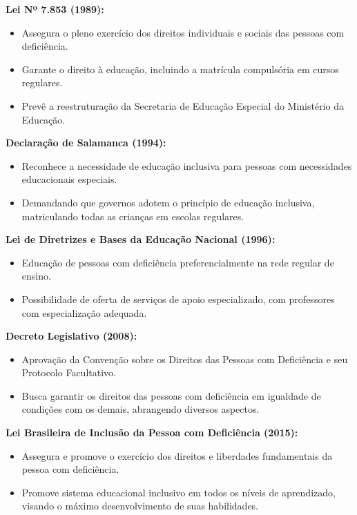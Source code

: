     \textbf{Lei Nº 7.853 (1989):}
    \begin{itemize}
        \item Assegura o pleno exercício dos direitos individuais e sociais das pessoas com deficiência.
        \item Garante o direito à educação, incluindo a matrícula compulsória em cursos regulares.
        \item Prevê a reestruturação da Secretaria de Educação Especial do Ministério da Educação.
    \end{itemize}

    \textbf{Declaração de Salamanca (1994):}
    \begin{itemize}
        \item Reconhece a necessidade de educação inclusiva para pessoas com necessidades educacionais especiais.
        \item Demandando que governos adotem o princípio de educação inclusiva, matriculando todas as crianças em escolas   regulares.
    \end{itemize}

    \textbf{Lei de Diretrizes e Bases da Educação Nacional (1996):}
    \begin{itemize}
        \item Educação de pessoas com deficiência preferencialmente na rede regular de ensino.
        \item Possibilidade de oferta de serviços de apoio especializado, com professores com especialização adequada.
        
    \end{itemize}

    \textbf{Decreto Legislativo (2008):}
    \begin{itemize}
        \item Aprovação da Convenção sobre os Direitos das Pessoas com Deficiência e seu Protocolo Facultativo.
        \item Busca garantir os direitos das pessoas com deficiência em igualdade de condições com os demais, abrangendo diversos aspectos.
        
    \end{itemize}

    \textbf{Lei Brasileira de Inclusão da Pessoa com Deficiência (2015):}
    \begin{itemize}
        \item Assegura e promove o exercício dos direitos e liberdades fundamentais da pessoa com deficiência.
        \item Promove sistema educacional inclusivo em todos os níveis de aprendizado, visando o máximo desenvolvimento de suas habilidades.
        
    \end{itemize}
   
